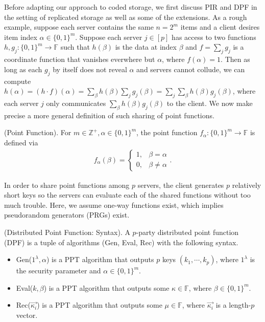 \documentclass[11pt]{article}
\newcommand{\Gen}{\textsf{Gen}}
\newcommand{\Eval}{\textsf{Eval}}
\newcommand{\Rec}{\textsf{Rec}}
\begin{document}
Before adapting our approach to coded storage, we first discuss PIR and DPF in the setting of replicated storage as well as some of the extensions. As a rough example, suppose each server contains the same $n = 2^m$ items and a client desires item index $\alpha \in \{0,1\}^m$. Suppose each server $j \in [p]$ has access to two functions $h,g_j : \{0,1\}^m \to \mathbb{F}$ such that $h(\beta)$ is the data at index $\beta$ and $f = \sum_j g_j$ is a coordinate function that vanishes everwhere but $\alpha$, where $f(\alpha) = 1$. Then as long as each $g_j$ by itself does not reveal $\alpha$ and servers cannot collude, we can compute $h(\alpha) = (h \cdot f)(\alpha) = \sum_\beta h(\beta) \sum_j g_j(\beta) = \sum_j \sum_\beta h(\beta)g_j(\beta)$, where each server $j$ only communicates $\sum_\beta h(\beta)g_j(\beta)$ to the client. We now make precise a more general definition of such sharing of point functions.
\begin{definition}
(Point Function). For $m \in \mathbb{Z}^+, \alpha \in \{0,1\}^m$, the point function $f_{\alpha} : \{0,1\}^m \to \mathbb{F}$ is defined via
\begin{align*}
  f_{\alpha}(\beta) = \begin{cases}
  1, &\beta = \alpha\\
  0, &\beta \neq \alpha
  \end{cases}.
\end{align*}
\end{definition}
In order to share point functions among $p$ servers, the client generates $p$ relatively short keys so the servers can evaluate each of the shared functions without too much trouble. Here, we assume one-way functions exist, which implies pseudorandom generators (PRGs) exist.
\begin{definition}
(Distributed Point Function: Syntax). A $p$-party distributed point function (DPF) is a tuple of algorithms (\Gen, \Eval, \Rec) with the following syntax.
\begin{itemize}
  \item \Gen($1^\lambda, \alpha$) is a PPT algorithm that outputs $p$ keys $(k_1, \cdots, k_p)$, where $1^\lambda$ is the security parameter and $\alpha \in \{0,1\}^m$.
  \item \Eval($k, \beta$) is a PPT algorithm that outputs some $\kappa \in \mathbb{F}$, where $\beta \in \{0,1\}^m$.
  \item \Rec($\overrightarrow{\kappa_i}$) is a PPT algorithm that outputs some $\mu \in \mathbb{F}$, where $\overrightarrow{\kappa_i}$ is a length-$p$ vector.
\end{itemize}
\end{definition}
\end{document}
